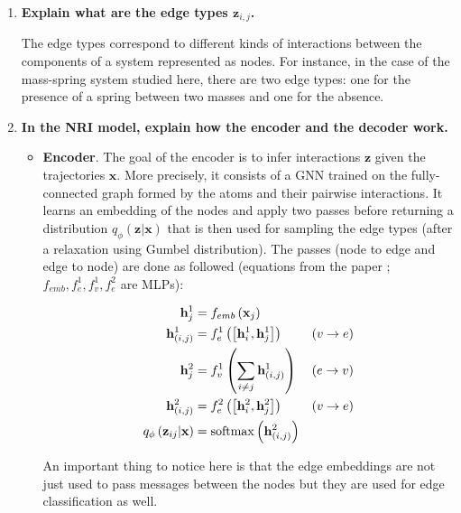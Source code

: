 \documentclass[a4paper, 11pt]{article}
\begin{document}
\begin{enumerate}
	\item \textbf{Explain what are the edge types $\mathbf{z}_{i,j}$.}
	
	The edge types correspond to different kinds of interactions between the components of a system represented as nodes. For instance, in the case of the mass-spring system studied here, there are two edge types: one for the presence of a spring between two masses and one for the absence.
	
	\item \textbf{In the NRI model, explain how the encoder and the decoder work.}
	
	\begin{itemize}
	    \item \textbf{Encoder}. The goal of the encoder is to infer interactions $\mathbf{z}$ given the trajectories $\mathbf{x}$. More precisely, it consists of a GNN trained on the fully-connected graph formed by the atoms and their pairwise interactions. It learns an embedding of the nodes and apply two passes before returning a distribution $q_{\phi} \left( \mathbf{z} | \mathbf{x} \right)$ that is then used for sampling the edge types (after a relaxation using Gumbel distribution). The passes (node to edge and edge to node) are done as followed (equations from the paper ; $f_{emb}, f_{e}^{1}, f_{v}^{1}, f_{e}^{2}$ are MLPs):
	    
	    \begin{equation*}
	        \begin{aligned}
	        \mathbf{h}_{j}^{1} &= f_{emb} \left( \mathbf{x}_{j} \right) \\
	        \mathbf{h}_{(i, j)}^{1} &= f_{e}^{1} \left( \left[ \mathbf{h}_{i}^{1}, \mathbf{h}_{j}^{1} \right] \right) & (v \rightarrow e) \\
	        \mathbf{h}_{j}^{2} &= f_{v}^{1} \left( \sum_{i \neq j} \mathbf{h}_{(i, j)}^{1} \right) & (e \rightarrow v) \\
	        \mathbf{h}_{(i, j)}^{2} &= f_{e}^{2} \left( \left[ \mathbf{h}_{i}^{2}, \mathbf{h}_{j}^{2} \right] \right) & (v \rightarrow e) \\
	        q_{\phi} \left( \mathbf{z}_{ij} | \mathbf{x} \right) &= \operatorname{softmax} \left( \mathbf{h}_{(i, j)}^{2} \right)
	        \end{aligned}
	    \end{equation*}
	    
	    An important thing to notice here is that the edge embeddings are not just used to pass messages between the nodes but they are used for edge classification as well.
	    

\end{itemize}
\end{enumerate}
\end{document}
